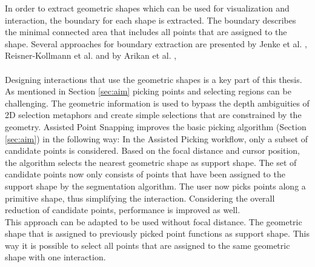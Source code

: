 In order to extract geometric shapes which can be used for visualization and interaction, the boundary for each shape is extracted. The boundary describes the minimal connected area that includes all points that are assigned to the shape. Several approaches for boundary extraction are presented by Jenke et al. \cite{jenke2008surface}, Reisner-Kollmann et al. \cite{reisner2013reconstructing} and by Arikan et al. \cite{arikan-2013-osn}, 
\\
\\
Designing interactions that use the geometric shapes is a key part of this thesis. As mentioned in Section \ref{sec:aim} picking points and selecting regions can be challenging. The geometric information is used to bypass the depth ambiguities of 2D selection metaphors and create simple selections that are constrained by the geometry. 
Assisted Point Snapping improves the basic picking algorithm (Section \ref{sec:aim}) in the following way: 
In the Assisted Picking workflow, only a subset of candidate points is considered. Based on the focal distance and cursor position, the algorithm selects the nearest geometric shape as support shape.  
The set of candidate points now only consists of points that have been assigned to the support shape by the segmentation algorithm. 
The user now picks points along a primitive shape, thus simplifying the interaction. Considering the overall reduction of candidate points, performance is improved as well. 
\\
This approach can be adapted to be used without focal distance. The geometric shape that is assigned to previously picked point functions as support shape. This way it is possible to select all points that are assigned to the same geometric shape with one interaction. 